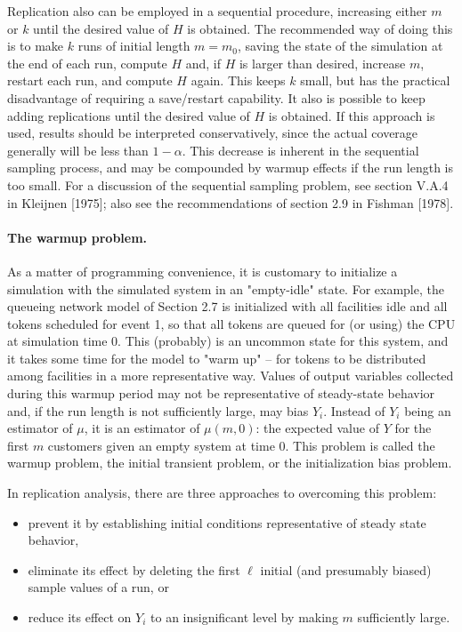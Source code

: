 Replication also can be employed in a sequential procedure, increasing either
$m$ or $k$ until the desired value of $H$ is obtained. The recommended way of
doing this is to make $k$ runs of initial length $m = m_0$, saving the state of
the simulation at the end of each run, compute $H$ and, if $H$ is larger than
desired, increase $m$, restart each run, and compute $H$ again. This keeps $k$
small, but has the practical disadvantage of requiring a save/restart
capability. It also is possible to keep adding replications until the desired
value of $H$ is obtained. If this approach is used, results should be
interpreted conservatively, since the actual coverage generally will be less
than $1 - \alpha$. This decrease is inherent in the sequential sampling
process, and may be compounded by warmup effects if the run length is too
small. For a discussion of the sequential sampling problem, see section V.A.4
in Kleijnen [1975]; also see the recommendations of section 2.9 in Fishman
[1978].

\paragraph{The warmup problem.}
As a matter of programming convenience, it is customary to initialize a
simulation with the simulated system in an "empty-idle" state. For example,
the queueing network model of Section 2.7 is initialized with all facilities
idle and all tokens scheduled for event 1, so that all tokens are queued for
(or using) the CPU at simulation time 0. This (probably) is an uncommon state
for this system, and it takes some time for the model to "warm up" -- for
tokens to be distributed among facilities in a more representative way.
Values of output variables collected during this warmup period may not be
representative of steady-state behavior and, if the run length is not
sufficiently large, may bias $Y_i$. Instead of $Y_i$ being an estimator of
$\mu$, it is an estimator of $\mu(m,0)$: the expected value of $Y$ for the
first $m$ customers given an empty system at time 0. This problem is called
the warmup problem, the initial transient problem, or the initialization bias
problem.

In replication analysis, there are three approaches to overcoming this
problem:

\begin{itemize}
\item prevent it by establishing initial conditions representative of steady
state behavior,
\item eliminate its effect by deleting the first $\ell$ initial (and
presumably biased) sample values of a run, or
\item reduce its effect on $Y_i$ to an insignificant level by making $m$
sufficiently large.
\end{itemize}

